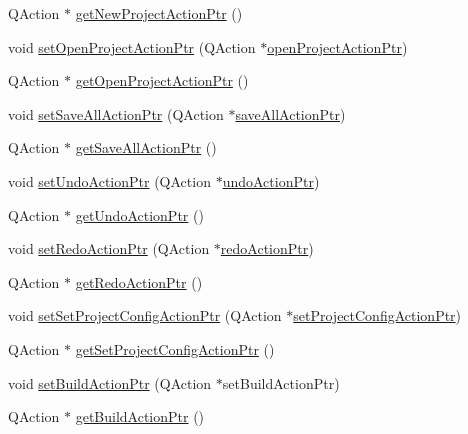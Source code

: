 \begin{DoxyCompactItemize}
\item 
Q\-Action $\ast$ \hyperlink{class_master_actions_a7065dfa244266181223b152795a996e9}{get\-New\-Project\-Action\-Ptr} ()
\item 
void \hyperlink{class_master_actions_abbbe38a813adedd51c5f7187c0d045a0}{set\-Open\-Project\-Action\-Ptr} (Q\-Action $\ast$\hyperlink{class_master_actions_a3b4d98cdbfaa8e287d420513a8df53ee}{open\-Project\-Action\-Ptr})
\item 
Q\-Action $\ast$ \hyperlink{class_master_actions_aac19d660169392d11b0ae1c2540cafb5}{get\-Open\-Project\-Action\-Ptr} ()
\item 
void \hyperlink{class_master_actions_a28b7a07a0c6932f5f8a55a778c1b2a0f}{set\-Save\-All\-Action\-Ptr} (Q\-Action $\ast$\hyperlink{class_master_actions_a4e9bf6410023b508d56f235903a44b5f}{save\-All\-Action\-Ptr})
\item 
Q\-Action $\ast$ \hyperlink{class_master_actions_afd7ef11ff065232fca47f971af02c5e5}{get\-Save\-All\-Action\-Ptr} ()
\item 
void \hyperlink{class_master_actions_ac1b4b1ac149aabb6530475503f715cd9}{set\-Undo\-Action\-Ptr} (Q\-Action $\ast$\hyperlink{class_master_actions_a23386959a2f60a89cc6ae1bff012c76c}{undo\-Action\-Ptr})
\item 
Q\-Action $\ast$ \hyperlink{class_master_actions_aeb84d87b232944fc289dd0425c79e1a7}{get\-Undo\-Action\-Ptr} ()
\item 
void \hyperlink{class_master_actions_aa470d0d50071545456339dd6efd1cd29}{set\-Redo\-Action\-Ptr} (Q\-Action $\ast$\hyperlink{class_master_actions_a7936a9bf0e7418cd864b2fb1ab786d09}{redo\-Action\-Ptr})
\item 
Q\-Action $\ast$ \hyperlink{class_master_actions_ab2015974980e97a75d5d91037be9545b}{get\-Redo\-Action\-Ptr} ()
\item 
void \hyperlink{class_master_actions_a3ec5d73b64fdadc42fe7eb63a3792d53}{set\-Set\-Project\-Config\-Action\-Ptr} (Q\-Action $\ast$\hyperlink{class_master_actions_abe52f232f77f5a5bff35c8e3dadb3d80}{set\-Project\-Config\-Action\-Ptr})
\item 
Q\-Action $\ast$ \hyperlink{class_master_actions_ad81b766a2f083ba53c529cd3f3582cd0}{get\-Set\-Project\-Config\-Action\-Ptr} ()
\item 
void \hyperlink{class_master_actions_a575820c5279053703a99071151ff82c4}{set\-Build\-Action\-Ptr} (Q\-Action $\ast$set\-Build\-Action\-Ptr)
\item 
Q\-Action $\ast$ \hyperlink{class_master_actions_a2c89cb4aa70c13526d98e449a1e3a1b9}{get\-Build\-Action\-Ptr} ()

\end{DoxyCompactItemize}
